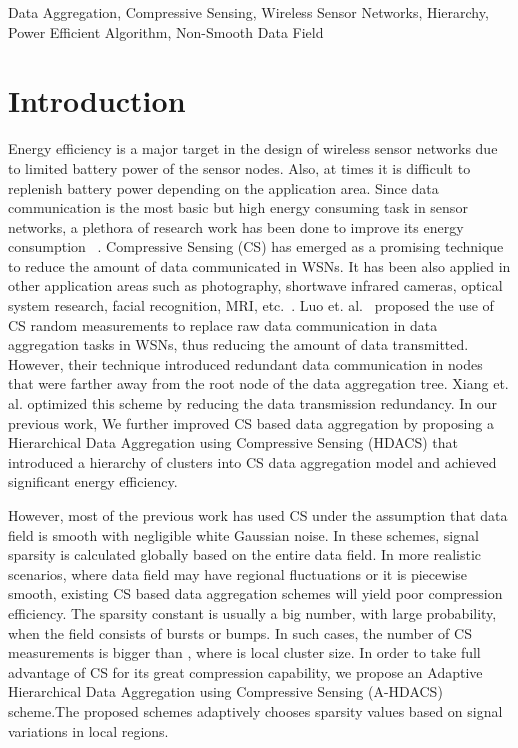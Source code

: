 \documentclass[conference]{IEEEtran}
\begin{document}
\begin{IEEEkeywords}
Data Aggregation, Compressive Sensing, Wireless Sensor Networks, Hierarchy, 
Power Efficient Algorithm, Non-Smooth Data Field
\end{IEEEkeywords}
\IEEEpeerreviewmaketitle


\section{Introduction}
Energy efficiency is a major target in the design of wireless sensor networks due to limited 
battery power of the sensor nodes. Also, at times it is difficult to replenish battery power 
depending on the application area. Since data communication is the most basic but high energy consuming task in 
sensor networks, a plethora of research work has been done to improve its 
energy consumption~\cite{DataAgg} \cite{DataAgg1} \cite{DataAgg2} \cite{DataAgg3}.
Compressive Sensing (CS) \cite{CS} \cite{CS_Richard} has emerged as a promising technique to reduce the amount of data communicated in WSNs.  
It has been also applied in other application areas such as photography, 
shortwave infrared cameras, optical system research, facial recognition, MRI, etc.~\cite{CS_App}.
Luo et. al.~\cite{BalCS} proposed the use of CS random measurements to replace raw data 
communication in data aggregation tasks in WSNs, thus reducing the amount of data transmitted. 
However, their technique introduced redundant data communication in nodes that were farther away 
from the root node of the data aggregation tree.
Xiang et. al.\cite{HybridCS1} \cite{HybridCS2} optimized this scheme 
by reducing the data transmission redundancy.  In our previous work, We further improved CS based data aggregation by proposing a 
Hierarchical Data Aggregation using Compressive Sensing (HDACS) \cite{HDACS}  
that introduced a hierarchy of clusters into CS data aggregation model and achieved 
significant energy efficiency. 

However, most of the previous work has used CS under the assumption that data 
field is smooth with negligible white Gaussian noise. In these schemes, signal 
sparsity is calculated globally based on the entire data field. 
In more realistic scenarios, where data field may have regional fluctuations or it is 
piecewise smooth, existing  CS based data aggregation schemes will yield poor compression efficiency.   
The sparsity constant  is usually a big number, with large probability, 
when the field consists of bursts or bumps. 
In such cases, the number of CS measurements  is bigger than , 
where  is local cluster size. In order to take full advantage of CS for its great compression capability,
we propose an Adaptive Hierarchical Data Aggregation using Compressive Sensing
(A-HDACS) scheme.The proposed schemes adaptively chooses sparsity values based on signal variations
in local regions. 
 
\end{document}
